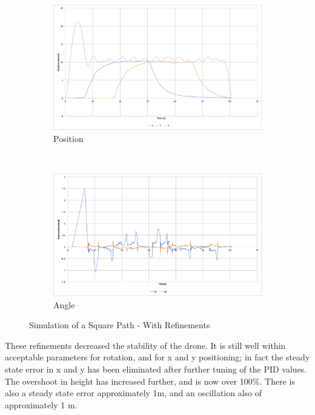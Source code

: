 \documentclass[11pt,twoside]{article}
\begin{document}
\begin{figure}
    \begin{subfigure}{\textwidth}
        \includegraphics[width=\linewidth]{square_path_limited_servos}
        \caption{Position}
        \label{fig:square_path_limited_servos}
    \end{subfigure}\hspace*{\fill}
    \\
    \begin{subfigure}{\textwidth}
        \includegraphics[width=\linewidth]{square_path_limited_servos_angle}
        \caption{Angle}
        \label{fig:square_path_limited_servos_angle}
    \end{subfigure}

    \caption{Simulation of a Square Path - With Refinements}
    \label{fig:Square Path Refined}
\end{figure}

These refinements decreased the stability of the drone. It is still well within acceptable parameters for rotation, and for x and y positioning; in fact the steady state error in x and y has been eliminated after further tuning of the PID values. The overshoot in height has increased further, and is now over 100\%. There is also a steady state error approximately 1m, and an oscillation also of approximately 1 m.
\label{height overshoot}
\end{document}
